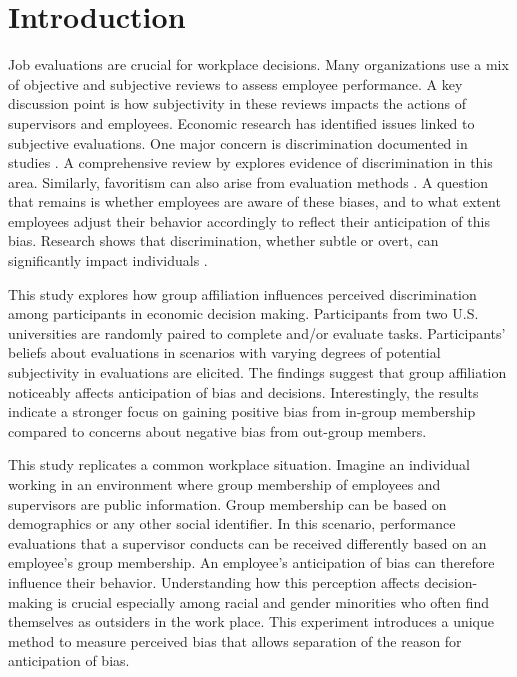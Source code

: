 \pagestyle{plain} 

\doublespacing

\section{Introduction} \label{sec:introduction}
Job evaluations are crucial for workplace decisions. Many organizations use a mix of objective and subjective reviews to assess employee performance. A key discussion point is how subjectivity in these reviews impacts the actions of supervisors and employees. Economic research has identified issues linked to subjective evaluations. One major concern is discrimination documented in studies \citep{goldin2000,bertrand2004}. A comprehensive review by \cite{bertrand2016} explores evidence of discrimination in this area. Similarly, favoritism can also arise from evaluation methods \citep{prendergast1996}. A question that remains is whether employees are aware of these biases, and to what extent employees adjust their behavior accordingly to reflect their anticipation of this bias. Research shows that discrimination, whether subtle or overt, can significantly impact individuals \citep{jones2016}. 

This study explores how group affiliation influences perceived discrimination among participants in economic decision making. Participants from two U.S. universities are randomly paired to complete and/or evaluate tasks. Participants' beliefs about evaluations in scenarios with varying degrees of potential subjectivity in evaluations are elicited. The findings suggest that group affiliation noticeably affects anticipation of bias and decisions. Interestingly, the results indicate a stronger focus on gaining positive bias from in-group membership compared to concerns about negative bias from out-group members.

This study replicates a common workplace situation. Imagine an individual working in an environment where group membership of employees and supervisors are public information. Group membership can be based on demographics or any other social identifier. In this scenario, performance evaluations that a supervisor conducts can be received differently based on an employee's group membership. An employee's anticipation of bias can therefore influence their behavior. Understanding how this perception affects decision-making is crucial especially among racial and gender minorities who often find themselves as outsiders in the work place. This experiment introduces a unique method to measure perceived bias that allows separation of the reason for anticipation of bias. 

